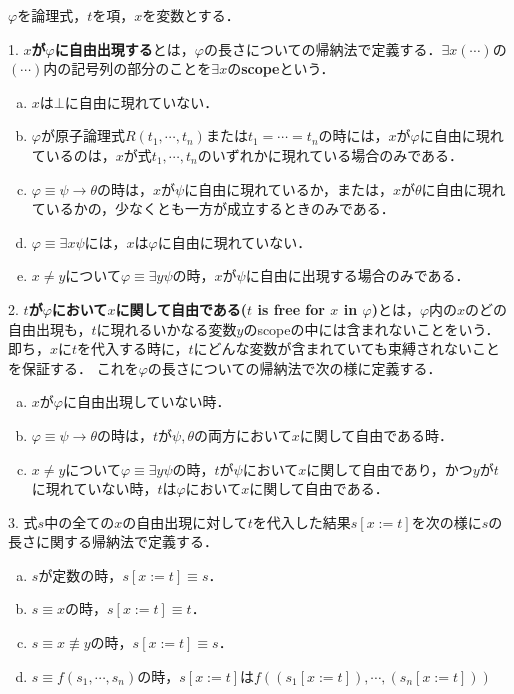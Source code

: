 \documentclass[uplatex, 12pt, dvipdfmx]{jsreport}
\begin{document}
\begin{definition}
    $\varphi$を論理式，$t$を項，$x$を変数とする．

    1. \textbf{$x$が$\varphi$に自由出現する}とは，$\varphi$の長さについての帰納法で定義する．$\exists x(\cdots)$の$(\cdots)$内の記号列の部分のことを$\exists x$の\textbf{scope}という．
    \begin{enumerate}[(a)]
        \item $x$は$\bot$に自由に現れていない．
        \item $\varphi$が原子論理式$R(t_1,\cdots,t_n)$または$t_1=\cdots=t_n$の時には，$x$が$\varphi$に自由に現れているのは，$x$が式$t_1,\cdots,t_n$のいずれかに現れている場合のみである．
        \item $\varphi\equiv\psi\to\theta$の時は，$x$が$\psi$に自由に現れているか，または，$x$が$\theta$に自由に現れているかの，少なくとも一方が成立するときのみである．
        \item $\varphi\equiv\exists x\psi$には，$x$は$\varphi$に自由に現れていない．
        \item $x\ne y$について$\varphi\equiv\exists y\psi$の時，$x$が$\psi$に自由に出現する場合のみである．
    \end{enumerate}

    2. \textbf{$t$が$\varphi$において$x$に関して自由である($t$ is free for $x$ in $\varphi$)}とは，$\varphi$内の$x$のどの自由出現も，$t$に現れるいかなる変数$y$のscopeの中には含まれないことをいう．即ち，$x$に$t$を代入する時に，$t$にどんな変数が含まれていても束縛されないことを保証する．
    これを$\varphi$の長さについての帰納法で次の様に定義する．
    \begin{enumerate}[(a)]
        \item $x$が$\varphi$に自由出現していない時．
        \item $\varphi\equiv\psi\to\theta$の時は，$t$が$\psi,\theta$の両方において$x$に関して自由である時．
        \item $x\ne y$について$\varphi\equiv\exists y\psi$の時，$t$が$\psi$において$x$に関して自由であり，かつ$y$が$t$に現れていない時，$t$は$\varphi$において$x$に関して自由である．
    \end{enumerate}

    3. 式$s$中の全ての$x$の自由出現に対して$t$を代入した結果$s[x:=t]$を次の様に$s$の長さに関する帰納法で定義する．
    \begin{enumerate}[(a)]
        \item $s$が定数の時，$s[x:=t]\equiv s$．
        \item $s\equiv x$の時，$s[x:=t]\equiv t$．
        \item $s\equiv x\not\equiv y$の時，$s[x:=t]\equiv s$．
        \item $s\equiv f(s_1,\cdots,s_n)$の時，$s[x:=t]$は$f((s_1[x:=t]),\cdots,(s_n[x:=t]))$
    \end{enumerate}


\end{definition}
\end{document}

